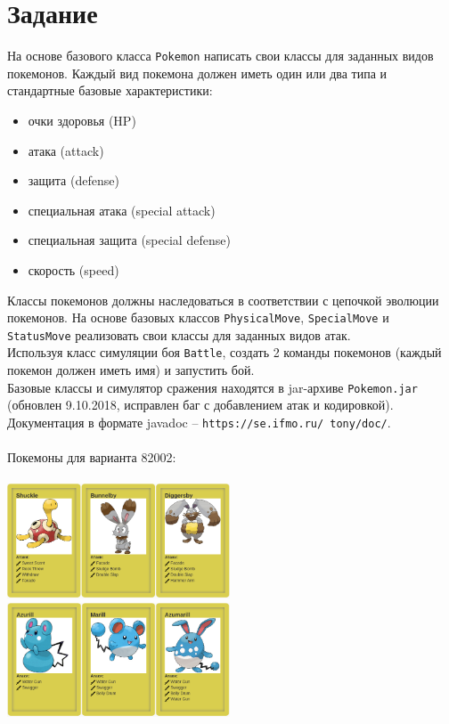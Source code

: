\documentclass[11pt]{article}
\begin{document}
\section{Задание}
На основе базового класса \texttt{Pokemon} написать свои классы для заданных видов покемонов. Каждый вид покемона должен иметь один или два типа и стандартные базовые характеристики:
\begin{itemize}
	\item очки здоровья (HP)
	\item атака (attack)
	\item защита (defense)
	\item специальная атака (special attack)
	\item специальная защита (special defense)
	\item скорость (speed)
\end{itemize}
Классы покемонов должны наследоваться в соответствии с цепочкой эволюции покемонов. На основе базовых классов \texttt{PhysicalMove}, \texttt{SpecialMove} и \texttt{StatusMove} реализовать свои классы для заданных видов атак.\\
Используя класс симуляции боя \texttt{Battle}, создать 2 команды покемонов (каждый покемон должен иметь имя) и запустить бой.\\
Базовые классы и симулятор сражения находятся в jar-архиве \texttt{Pokemon.jar} (обновлен 9.10.2018, исправлен баг с добавлением атак и кодировкой). 
Документация в формате javadoc -- \texttt{https://se.ifmo.ru/~tony/doc/}.\\\\
Покемоны для варианта 82002:\\\\
\includegraphics[width=250px]{../cards.png}\\
\includegraphics[width=250px]{../cards1.png}
\pagebreak
\end{document}
